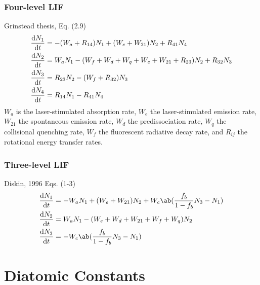 \documentclass[11pt, twoside, fleqn]{report}
\begin{document}
\subsection{Four-level LIF}

Grinstead thesis, Eq. (2.9)
\begin{align*}
    \odv{N_{1}}{t} & = -(W_{a} + R_{14})N_{1} + (W_{e} + W_{21})N_{2} + R_{41}N_{4}                      \\
    \odv{N_{2}}{t} & = W_{a}N_{1} - (W_{f} + W_{d} + W_{q} + W_{e} + W_{21} + R_{23})N_{2} + R_{32}N_{3} \\
    \odv{N_{3}}{t} & = R_{23}N_{2} - (W_{f} + R_{32})N_{3}                                               \\
    \odv{N_{4}}{t} & = R_{14}N_{1} - R_{41}N_{4}
\end{align*}
$W_{a}$ is the laser-stimulated absorption rate, $W_{e}$ the laser-stimulated emission rate, $W_{21}$ the spontaneous emission rate, $W_{d}$ the predissociation rate, $W_{q}$ the collisional quenching rate, $W_{f}$ the fluorescent radiative decay rate, and $R_{ij}$ the rotational energy transfer rates.

\subsection{Three-level LIF}

Diskin, 1996 Eqs. (1-3)
\begin{align*}
    \odv{N_{1}}{t} & = -W_{a}N_{1} + (W_{e} + W_{21})N_{2} + W_{c}\ab(\frac{f_{b}}{1 - f_{b}}N_{3} - N_{1}) \\
    \odv{N_{2}}{t} & = W_{a}N_{1} - (W_{e} + W_{d} + W_{21} + W_{f} + W_{q})N_{2}                           \\
    \odv{N_{3}}{t} & = -W_{c}\ab(\frac{f_{b}}{1 - f_{b}}N_{3} - N_{1})
\end{align*}

\appendix
\chapter{Diatomic Constants}
\label{a:diatomic_constants}
\end{document}
